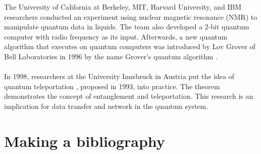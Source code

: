 \documentclass[12pt]{third-rep}
\begin{document}
The University of California at Berkeley, MIT, Harvard University, and IBM researchers conducted an experiment using nuclear magnetic resonance (NMR) to manipulate quantum data in liquids. The team also developed a 2-bit quantum computer with radio frequency as its input. Afterwards, a new quantum algorithm that executes on quantum computers was introduced by Lov Grover of Bell Laboratories in 1996 by the name Grover's quantum algorithm \cite{intro-qc}. \\\\
In 1998, researchers at the University Innsbruck in Austria put the idea of quantum teleportation \cite{teleport}, proposed in 1993, into practice. The theorem demonstrates the concept of entanglement and teleportation. This research is an implication for data transfer and network in the quantum system.

\begingroup
\renewcommand{\cleardoublepage}{}
\renewcommand{\clearpage}{}
\chapter{Making a bibliography}
\endgroup


\appendix

\end{document}
